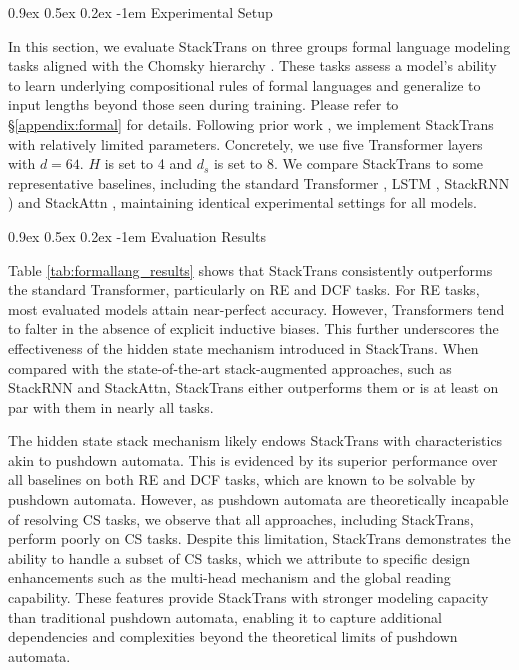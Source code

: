 \documentclass{article}
\makeatletter
\providecommand{\paragraph}{}
\renewcommand{\paragraph}[1]{%
  \@startsection{paragraph}{4}{\z@}%
                {0.9ex \@plus 0.5ex \@minus 0.2ex}%
                {-1em}%
                {\normalsize\bfseries}%
  {#1}
}
\DeclareRobustCommand{\method}{{\sc StackTrans}\xspace}
\makeatother
\begin{document}
\paragraph{Experimental Setup}  
\label{sec:formalsetup}
In this section, we evaluate \method on three groups formal language modeling tasks aligned with the Chomsky hierarchy \citep{deletang2022neural}. 
These tasks assess a model's ability to learn underlying compositional rules of formal languages and generalize to input lengths beyond those seen during training. Please refer to \S\ref{appendix:formal} for details.
Following prior work \citep{deletang2022neural}, we implement \method with relatively limited parameters. Concretely, we use five Transformer layers with $d=64$. $H$ is set to 4 and $d_s$ is set to 8.
We compare \method to some representative baselines, including the standard Transformer \citep{vaswani2017attention}, LSTM \citep{graves2012long}, StackRNN \citep{joulin2015inferring}) and StackAttn \citep{li2024Transformer}, maintaining identical experimental settings for all models.



\paragraph{Evaluation Results} 
Table \ref{tab:formallang_results} shows that \method consistently outperforms the standard Transformer, particularly on RE and DCF tasks.
For RE tasks, most evaluated models attain near-perfect accuracy. However, Transformers tend to falter in the absence of explicit inductive biases.
This further underscores the effectiveness of the hidden state mechanism introduced in \method.
When compared with the state-of-the-art stack-augmented approaches, such as StackRNN and StackAttn, \method either outperforms them or is at least on par with them in nearly all tasks.

The hidden state stack mechanism likely endows \method with characteristics akin to pushdown automata. This is evidenced by its superior performance over all baselines on both RE and DCF tasks, which are known to be solvable by pushdown automata. 
However, as pushdown automata are theoretically incapable of resolving CS tasks, we observe that all approaches, including \method, perform poorly on CS tasks.
Despite this limitation, \method demonstrates the ability to handle a subset of CS tasks, which we attribute to specific design enhancements such as the multi-head mechanism and the global reading capability.
These features provide \method with stronger modeling capacity than traditional pushdown automata, enabling it to capture additional dependencies and complexities beyond the theoretical limits of pushdown automata.
\end{document}
